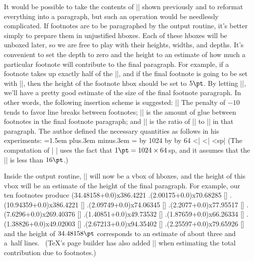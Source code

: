 {It would be possible to take the contents of\/ |\box\footins| shown
previously and to reformat everything into a paragraph, but such an operation
would be needlessly complicated. If footnotes are to be paragraphed by the
output routine, it's better simply to prepare them in unjustified
hboxes. Each of these hboxes will be unboxed later, so we are free to play
with their heights, widths, and depths. It's convenient to set the
depth to zero and the height to an estimate of how much a particular
footnote will contribute to the final paragraph. For example, if
a footnote takes up exactly half of the |\hsize|, and if the final
footnote is going to be set with |\baselineskip=10pt|, then the
height of the footnote hbox should be set to $5\pt$. By letting
|\count{}|, we'll have a pretty good estimate of the size
of the final footnote paragraph. In other words, the following
insertion scheme is suggested:
\begindisplay
|\insert{}|\cr
\enddisplay
The penalty of $-10$ tends to favor line breaks between footnotes;
|\footglue| is the amount of glue between footnotes in the final
footnote paragraph; and |\fudgefactor| is the ratio of\/ |\baselineskip|
to |\hsize| in that paragraph. The author defined the necessary quantities
as follows in his experiments:
\begintt
\eightpoint \newskip\footglue \footglue=1.5em plus.3em minus.3em
\newdimen\footnotebaselineskip \footnotebaselineskip=10pt
=\footnotebaselineskip \multiply{} by 1024
\divide {} by \hsize \multiply{} by 64
\xdef\fudgefactor{\expandafter\getfactor\the\dimen0 }
\endtt
^^|\multiply| ^^|\divide| ^^|sp|
(The computation of\/ |\fudgefactor| uses the fact that $1\pt=1024\times64\,$sp,
and it assumes that the |\footnotebaselineskip| is less than $16\pt$.)

Inside the output routine, |\box\footins| will now be a vbox of hboxes, and the
height of this vbox will be an estimate of the height of the final paragraph.
For example, our ten footnotes produce
\begintt
\vbox(34.48158+0.0)x386.4221
.\hbox(2.00175+0.0)x70.68285 []
.\hbox(10.94359+0.0)x386.4221 []
.\hbox(2.09749+0.0)x74.06345 []
.\hbox(2.2077+0.0)x77.95517 []
.\hbox(7.6296+0.0)x269.40376 []
.\hbox(1.40851+0.0)x49.73532 []
.\hbox(1.87659+0.0)x66.26334 []
.\hbox(1.38826+0.0)x49.02003 []
.\hbox(2.67213+0.0)x94.35402 []
.\hbox(2.25597+0.0)x79.65926 []
\endtt
and the height of $34.48158\pt$ corresponds to an estimate of about
three and a~half lines. \ (\TeX's page builder has also added |\skip\footins|
when estimating the total contribution due to footnotes.)

}
